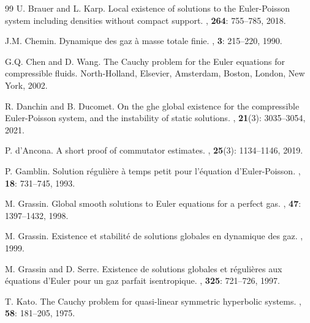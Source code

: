 \documentclass[11pt,twoside]{amsart}
\begin{document}
\begin{thebibliography}{99}
 U. Brauer and L. Karp.
\newblock Local existence of solutions to the Euler-Poisson system including densities without compact support.
, {\bf 264}: 755--785, 2018.

J.M. Chemin.
\newblock Dynamique des gaz \`a masse totale finie.
, {\bf 3}: 215--220, 1990.

G.Q. Chen and  D. Wang.
\newblock The Cauchy problem for the Euler equations for compressible fluids.
\newblock North-Holland, Elsevier, Amsterdam, Boston, London, New York, 2002.


R. Danchin  and B. Ducomet.
\newblock  On the ghe global existence for the compressible Euler-Poisson system, and the instability of static solutions.
,  
{\bf 21}(3): 3035--3054, 2021.


P. d'Ancona.
\newblock A short proof of commutator estimates.
,
{\bf 25}(3): 1134--1146, 2019.



P. Gamblin.
\newblock Solution r\'eguli\`ere \`a temps petit pour l'\'equation d'Euler-Poisson.
, {\bf 18}: 
731--745, 1993.

 M. Grassin.
\newblock Global smooth solutions to Euler equations for a perfect gas.
, {\bf 47}: 1397--1432, 1998.

M. Grassin.
\newblock Existence et stabilit\'e de solutions globales en dynamique des gaz.
, 1999.

M. Grassin and D. Serre.
\newblock Existence de solutions globales et r\'eguli\`eres aux \'equations d'Euler pour un gaz parfait isentropique.
, {\bf 325}: 721--726, 1997.



T. Kato.
\newblock The Cauchy problem for quasi-linear symmetric hyperbolic systems.
, {\bf 58}: 181--205, 1975.


\end{thebibliography}
\end{document}
